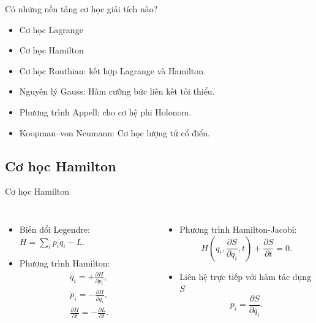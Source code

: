 \begin{frame}{Có những nền tảng cơ học giải tích nào?}
    \begin{itemize}
        \item Cơ học Lagrange
        \item Cơ học Hamilton
        \item Cơ học Routhian: kết hợp Lagrange và Hamilton.
        \item Nguyên lý Gauss: Hàm cưỡng bức liên kết tối thiểu.
        \item Phương trình Appell: cho cơ hệ phi Holonom.
        \item Koopman–von Neumann: Cơ học lượng tử cổ điển.
    \end{itemize}
\end{frame}

\subsection{Cơ học Hamilton}

\begin{frame}{Cơ học Hamilton}

\begin{columns}
    \begin{itemize}
        \item Biến đổi Legendre: \( H = \sum_{i} p_i \dot{q}_i - L \).
        \item Phương trình Hamilton:
        \vspace{-2mm}
        \begin{align}
            & \dot{q}_i = +\frac{\partial H}{\partial p_i}, \\
            & \dot{p}_i = -\frac{\partial H}{\partial q_i}, \\
            & \frac{\partial H}{\partial t} = - \frac{\partial L}{\partial t}.
        \end{align}
    \end{itemize}
    \begin{itemize}
        \item Phương trình Hamilton-Jacobi:
        \vspace{-2mm}
        \begin{equation}
            H \left( q_i, \frac{\partial S}{\partial q_i}, t \right) + \frac{\partial S}{\partial t} = 0.
        \end{equation}
        \item Liên hệ trực tiếp với hàm tác dụng \(S\)
        \begin{equation}
            p_i = \frac{\partial S}{\partial q_i}.
        \end{equation}
    \end{itemize}
\end{columns}
\end{frame}


